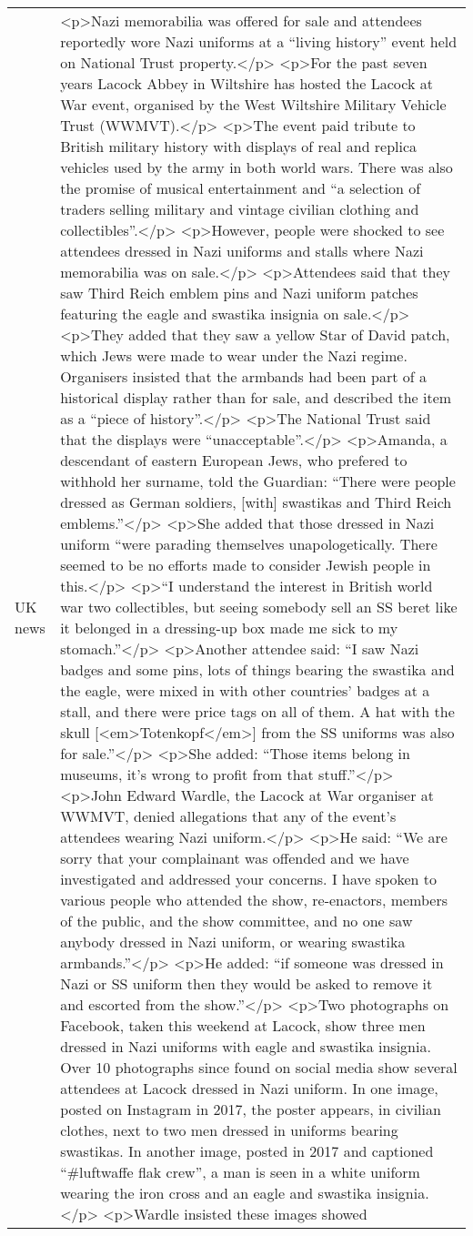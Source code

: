 \documentclass[]{article}
\begin{document}
\begin{table}[!h]
{\begin{tabular}[t]{ll}
UK news & <p>Nazi memorabilia was offered for sale and attendees reportedly wore Nazi uniforms at a “living history” event held on National Trust property.</p> <p>For the past seven years Lacock Abbey in Wiltshire has hosted the Lacock at War event, organised by the West Wiltshire Military Vehicle Trust (WWMVT).</p> <p>The event paid tribute to British military history with displays of real and replica vehicles used by the army in both world wars. There was also the promise of musical entertainment and “a selection of traders selling military and vintage civilian clothing and collectibles”.</p> <p>However, people were shocked to see attendees dressed in Nazi uniforms and stalls where Nazi memorabilia was on sale.</p> <p>Attendees said that they saw Third Reich emblem pins and Nazi uniform patches featuring the eagle and swastika insignia on sale.</p> <p>They added that they saw a yellow Star of David patch, which Jews were made to wear under the Nazi regime. Organisers insisted that the armbands had been part of a historical display rather than for sale, and described the item as a “piece of history”.</p> <p>The National Trust said that the displays were “unacceptable”.</p> <p>Amanda, a descendant of eastern European Jews, who prefered to withhold her surname, told the Guardian: “There were people dressed as German soldiers, [with] swastikas and Third Reich emblems.”</p> <p>She added that those dressed in Nazi uniform “were parading themselves unapologetically. There seemed to be no efforts made to consider Jewish people in this.</p> <p>“I understand the interest in British world war two collectibles, but seeing somebody sell an SS beret like it belonged in a dressing-up box made me sick to my stomach.”</p> <p>Another attendee said: “I saw Nazi badges and some pins, lots of things bearing the swastika and the eagle, were mixed in with other countries’ badges at a stall, and there were price tags on all of them. A hat with the skull [<em>Totenkopf</em>] from the SS uniforms was also for sale.”</p> <p>She added: “Those items belong in museums, it’s wrong to profit from that stuff.”</p> <p>John Edward Wardle, the Lacock at War organiser at WWMVT, denied allegations that any of the event’s attendees wearing Nazi uniform.</p> <p>He said: “We are sorry that your complainant was offended and we have investigated and addressed your concerns. I have spoken to various people who attended the show, re-enactors, members of the public, and the show committee, and no one saw anybody dressed in Nazi uniform, or wearing swastika armbands.”</p> <p>He added: “if someone was dressed in Nazi or SS uniform then they would be asked to remove it and escorted from the show.”</p> <p>Two photographs on Facebook, taken this weekend at Lacock, show three men dressed in Nazi uniforms with eagle and swastika insignia. Over 10 photographs since found on social media show several attendees at Lacock dressed in Nazi uniform. In one image, posted on Instagram in 2017, the poster appears, in civilian clothes, next to two men dressed in uniforms bearing swastikas. In another image, posted in 2017 and captioned “\#luftwaffe flak crew”, a man is seen in a white uniform wearing the iron cross and an eagle and swastika insignia.</p> <p>Wardle insisted these images showed 
\end{tabular}}
\end{table}
\end{document}
